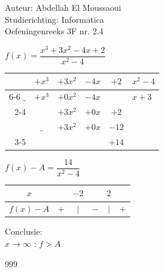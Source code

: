 \documentclass[a4paper]{article}
\begin{document}
  
\noindent \large Auteur: Abdellah El Moussaoui \\
\noindent \large Studierichting: Informatica\\
\noindent \large Oefeningenreeks 3F nr. 2.4\\

\medskip

\normalsize

$ f(x) = \dfrac{x^3+3x^2-4x+2}{x^2-4} $ \\

\bigskip

\begin{tabular}{rcccc|l}
     & $+x^3$  & $+3x^2$  & $-4x$  & $+2$  & $x^2-4$  \\ \cline{6-6} 
$\_$ & $+x^3$  & $+0x^2$  & $-4x$  &       & $x+3$ \\ \cline{2-4}
     &         & $+3x^2$   & $+0x$  &  $+2$     &        \\
     & $\_$     & $+3x^2$  & $+0x$  & $-12$ &        \\ \cline{3-5}
     &          &       &          &  $+14$ &       \\ 
\end{tabular}

\bigskip

$ f(x) - A = \dfrac{14}{x^2 -4}$ \\

\bigskip

\begin{tabular}{c|ccccc}
$x$		   &     & $-2$ &           & $2$  \\ \hline
$f(x) - A$ & $+$ & $|$  & $-$ & $|$ & $+$  \\
\end{tabular}

\bigskip

Conclusie: \\

$ x \rightarrow \infty $ : $ f > A $ \\ 


\begin{thebibliography}{999}
\end{thebibliography}
\end{document}
